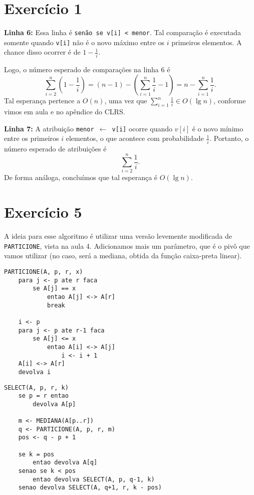 \documentclass[a4paper,12pt]{article}
\begin{document}
\section*{Exercício 1}

\textbf{Linha 6:} Essa linha é \verb|senão se v[i] < menor|. Tal comparação é executada somente quando \verb|v[i]| não é o novo máximo entre os $i$ primeiros elementos. A chance disso ocorrer é de $1 - \frac{1}{i}$.

Logo, o número esperado de comparações na linha 6 é
\[
\sum_{i=2}^n \left(1 - \frac{1}{i}\right) 
= (n-1) - \left(\sum_{i=1}^{n} \frac{1}{i} - 1\right) 
= n - \sum_{i=1}^{n} \frac{1}{i}.
\]
Tal esperança pertence a $O(n)$, uma vez que $\sum_{i=1}^{n} \frac{1}{i} \in O(\lg n)$, conforme vimos em aula e no apêndice do CLRS.

\textbf{Linha 7:} A atribuição \texttt{menor $\gets$ v[i]} ocorre quando $v[i]$ é o novo mínimo entre os primeiros $i$ elementos, o que acontece com probabilidade $\tfrac{1}{i}$.  
Portanto, o número esperado de atribuições é
\[ \sum_{i=2}^n \frac{1}{i}. \]
De forma análoga, concluímos que tal esperança é $O(\lg n)$.

\newpage

\section*{Exercício 5}

A ideia para esse algoritmo é utilizar uma versão levemente modificada de \verb|PARTICIONE|, vista na aula 4. Adicionamos mais um parâmetro, que é o pivô que vamos utilizar (no caso, será a mediana, obtida da função caixa-preta linear).

\begin{lstlisting}
PARTICIONE(A, p, r, x)
	para j <- p ate r faca
		se A[j] == x
			entao A[j] <-> A[r]
			break
	
	i <- p
	para j <- p ate r-1 faca
		se A[j] <= x
			entao A[i] <-> A[j]
				i <- i + 1
	A[i] <-> A[r]
	devolva i
\end{lstlisting}

\begin{lstlisting}
SELECT(A, p, r, k)
	se p = r entao
		devolva A[p]
	
	m <- MEDIANA(A[p..r])
	q <- PARTICIONE(A, p, r, m)
	pos <- q - p + 1
	
	se k = pos
		entao devolva A[q]
	senao se k < pos
		entao devolva SELECT(A, p, q-1, k)
	senao devolva SELECT(A, q+1, r, k - pos)
\end{lstlisting}
\end{document}
